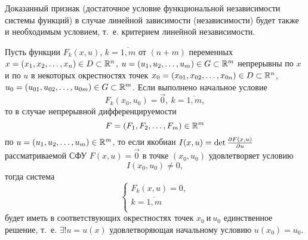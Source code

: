 \documentclass[../main.tex]{subfiles}
\begin{document}
\begin{remark}
	\;
	
	Доказанный признак (достаточное условие функциональной 
	независимости системы функций) 
	в случае линейной зависимости (независимости) будет также и 
	необходимым условием, т.~е. критерием линейной независимости.
\end{remark}
\begin{thm}
Пусть функции $F_k\left(x, u\right)$, $k = \overline{1, m}$
от $(n+ m)$ переменных 
$x = \left(x_1, x_2, \dots, x_n\right) \in D \subset \mathbb{R}^n$,
$u = \left(u_1, u_2, \dots, u_m\right) \in G \subset \mathbb{R}^m$
непрерывны по $x$ и по $u$ в некоторых окрестностях точек
$x_0 = \left(x_{01}, x_{02}, \dots, x_{0n}\right) \in D 
\subset \mathbb{R}^n$,
$u_0 = \left(u_{01}, u_{02}, \dots, u_{0m}\right) \in G
\subset \mathbb{R}^m$. Если выполнено начальное условие
\begin{equation}
    \label{lec_9.num_12}
    F_k(x_0, u_0) = \vec{0},\ k = \overline{1, m},
\end{equation}
то в случае непрерывной дифференцируемости
\begin{equation}
    \label{lec_9.num_13}
    F = \left(F_1, F_2, \dots, F_m\right) \in \mathbb{R}^m
\end{equation}
по $u = \left(u_1, u_2, \dots, u_m\right) \in \mathbb{R}^m$,
то если якобиан
$I(x, u) = \det\frac{\partial F\left(x, u\right)}{\partial u}$
рассматриваемой СФУ $F\left(x, u\right) = \vec{0}$
в точке $\left(x_0, u_0\right)$ удовлетворяет условию
\begin{equation}
    \label{lec_9.num_14}
    I(x_0, u_0) \neq 0,
\end{equation}
тогда система \begin{equation}
    \label{lec_9.num_7}
    \begin{cases} 
        F_k\left(x, u\right) = 0, \\ 
        k = \overline{1, m} \\
    \end{cases}    
\end{equation} будет иметь в 
соответствующих окрестностях точек $x_0\ \text{и}\ u_0$
единственное решение, т.~е. $\exists!u = u(x)$ удовлетворяющая начальному
 условию $u(x_0) = u_0$.
\end{thm}
\end{document}
